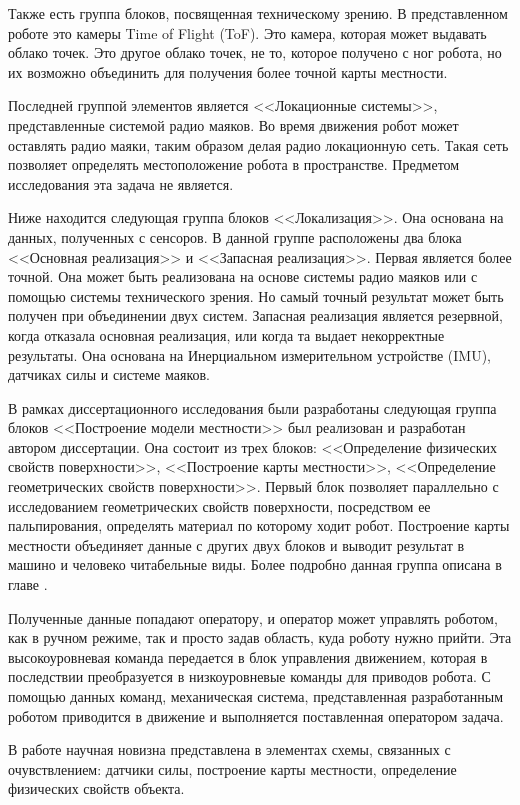 Также есть группа блоков, посвященная техническому зрению. В представленном роботе это камеры Time of Flight (ToF). Это камера, которая может выдавать облако точек. Это другое облако точек, не то, которое получено с ног робота, но их возможно объединить для получения более точной карты местности.

Последней группой элементов является <<Локационные системы>>, представленные системой радио маяков. Во время движения робот может оставлять радио маяки, таким образом делая радио локационную сеть. Такая сеть позволяет определять местоположение робота в пространстве. Предметом исследования эта задача не является.

Ниже находится следующая группа блоков <<Локализация>>. Она основана на данных, полученных с сенсоров. В данной группе расположены два блока <<Основная реализация>> и <<Запасная реализация>>. Первая является более точной. Она может быть реализована на основе системы радио маяков или с помощью системы технического зрения. Но самый точный результат может быть получен при объединении двух систем. Запасная реализация является резервной, когда отказала основная реализация, или когда та выдает некорректные результаты. Она основана на Инерциальном измерительном устройстве (IMU), датчиках силы и системе маяков.

В рамках диссертационного исследования были разработаны следующая группа блоков <<Построение модели местности>> был реализован и разработан автором диссертации. Она состоит из трех блоков: <<Определение физических свойств поверхности>>, <<Построение карты местности>>, <<Определение геометрических свойств поверхности>>. Первый блок позволяет параллельно с исследованием геометрических свойств поверхности, посредством ее пальпирования, определять материал по которому ходит робот. Построение карты местности объединяет данные с других двух блоков и выводит результат в машино и человеко читабельные виды. Более подробно данная группа описана в главе .

Полученные данные попадают оператору, и оператор может управлять роботом, как в ручном режиме, так и просто задав область, куда роботу нужно прийти. Эта высокоуровневая команда передается в блок управления движением, которая в последствии преобразуется в низкоуровневые команды для приводов робота. С помощью данных команд, механическая система, представленная разработанным роботом приводится в движение и выполняется поставленная оператором задача.

В работе научная новизна представлена в элементах схемы, связанных с очувствлением: датчики силы, построение карты местности, определение физических свойств объекта.

